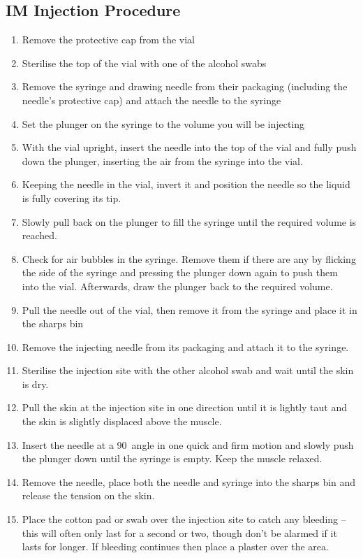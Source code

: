 \documentclass[twoside,a5paper]{article}
\begin{document}
\subsection{IM Injection Procedure}
\label{subsec:injection-procedure}

\begin{enumerate}
\item Remove the protective cap from the vial
\item Sterilise the top of the vial with one of the alcohol swabs
\item Remove the syringe and drawing needle from their packaging
  (including the needle's protective cap) and attach the needle to the
  syringe
\item Set the plunger on the syringe to the volume you will be injecting
\item With the vial upright, insert the needle into the top of the
  vial and fully push down the plunger, inserting the air from the
  syringe into the vial.
\item Keeping the needle in the vial, invert it and position the
  needle so the liquid is fully covering its tip.
\item Slowly pull back on the plunger to fill the syringe until the
  required volume is reached.
\item Check for air bubbles in the syringe. Remove them if there are
  any by flicking the side of the syringe and pressing the plunger
  down again to push them into the vial.  Afterwards, draw the plunger
  back to the required volume.
\item Pull the needle out of the vial, then remove it from the syringe
  and place it in the sharps bin
\item Remove the injecting needle from its packaging and attach it to
  the syringe.
\item Sterilise the injection site with the other alcohol swab and
  wait until the skin is dry.
\item Pull the skin at the injection site in one direction until it is
  lightly taut and the skin is slightly displaced above the muscle.
\item Insert the needle at a 90\textdegree\ angle in one quick and firm
  motion and slowly push the plunger down until the syringe is empty.
  Keep the muscle relaxed.
\item Remove the needle, place both the needle and syringe into the
  sharps bin and release the tension on the skin.
\item Place the cotton pad or swab over the injection site to catch
  any bleeding -- this will often only last for a second or two,
  though don't be alarmed if it lasts for longer.  If bleeding
  continues then place a plaster over the area.
\end{enumerate}
\end{document}
